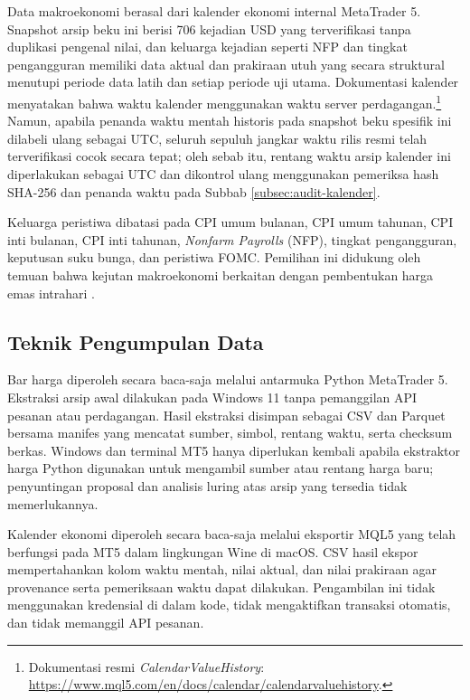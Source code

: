 Data makroekonomi berasal dari kalender ekonomi internal MetaTrader 5. Snapshot arsip beku ini berisi 706 kejadian USD yang terverifikasi tanpa duplikasi pengenal nilai, dan keluarga kejadian seperti NFP dan tingkat pengangguran memiliki data aktual dan prakiraan utuh yang secara struktural menutupi periode data latih dan setiap periode uji utama. Dokumentasi kalender menyatakan bahwa waktu kalender menggunakan waktu server perdagangan.\footnote{Dokumentasi resmi \emph{CalendarValueHistory}: \url{https://www.mql5.com/en/docs/calendar/calendarvaluehistory}.} Namun, apabila penanda waktu mentah historis pada snapshot beku spesifik ini dilabeli ulang sebagai UTC, seluruh sepuluh jangkar waktu rilis resmi telah terverifikasi cocok secara tepat; oleh sebab itu, rentang waktu arsip kalender ini diperlakukan sebagai UTC dan dikontrol ulang menggunakan pemeriksa hash SHA-256 dan penanda waktu pada Subbab \ref{subsec:audit-kalender}.

Keluarga peristiwa dibatasi pada CPI umum bulanan, CPI umum tahunan, CPI inti bulanan, CPI inti tahunan, \emph{Nonfarm Payrolls} (NFP), tingkat pengangguran, keputusan suku bunga, dan peristiwa FOMC. Pemilihan ini didukung oleh temuan bahwa kejutan makroekonomi berkaitan dengan pembentukan harga emas intrahari \parencite{sobti2021how}.

\subsection{Teknik Pengumpulan Data}

Bar harga diperoleh secara baca-saja melalui antarmuka Python MetaTrader 5. Ekstraksi arsip awal dilakukan pada Windows 11 tanpa pemanggilan API pesanan atau perdagangan. Hasil ekstraksi disimpan sebagai CSV dan Parquet bersama manifes yang mencatat sumber, simbol, rentang waktu, serta checksum berkas. Windows dan terminal MT5 hanya diperlukan kembali apabila ekstraktor harga Python digunakan untuk mengambil sumber atau rentang harga baru; penyuntingan proposal dan analisis luring atas arsip yang tersedia tidak memerlukannya.

Kalender ekonomi diperoleh secara baca-saja melalui eksportir MQL5 yang telah berfungsi pada MT5 dalam lingkungan Wine di macOS. CSV hasil ekspor mempertahankan kolom waktu mentah, nilai aktual, dan nilai prakiraan agar provenance serta pemeriksaan waktu dapat dilakukan. Pengambilan ini tidak menggunakan kredensial di dalam kode, tidak mengaktifkan transaksi otomatis, dan tidak memanggil API pesanan.

